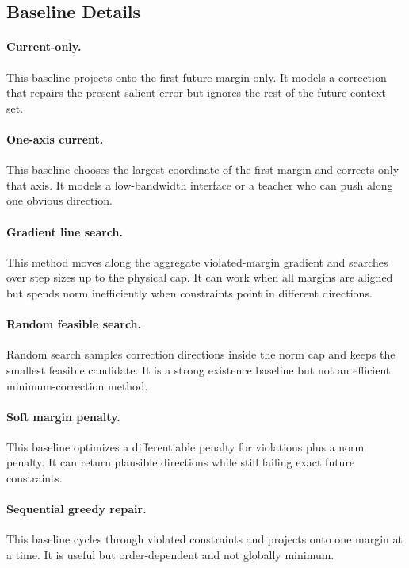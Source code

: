 \documentclass{article}
\begin{document}
\subsection{Baseline Details}

\paragraph{Current-only.}
This baseline projects onto the first future margin only. It models a correction
that repairs the present salient error but ignores the rest of the future
context set.

\paragraph{One-axis current.}
This baseline chooses the largest coordinate of the first margin and corrects
only that axis. It models a low-bandwidth interface or a teacher who can push
along one obvious direction.

\paragraph{Gradient line search.}
This method moves along the aggregate violated-margin gradient and searches over
step sizes up to the physical cap. It can work when all margins are aligned but
spends norm inefficiently when constraints point in different directions.

\paragraph{Random feasible search.}
Random search samples correction directions inside the norm cap and keeps the
smallest feasible candidate. It is a strong existence baseline but not an
efficient minimum-correction method.

\paragraph{Soft margin penalty.}
This baseline optimizes a differentiable penalty for violations plus a norm
penalty. It can return plausible directions while still failing exact future
constraints.

\paragraph{Sequential greedy repair.}
This baseline cycles through violated constraints and projects onto one margin
at a time. It is useful but order-dependent and not globally minimum.
\end{document}
